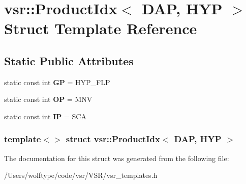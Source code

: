 \hypertarget{structvsr_1_1_product_idx_3_01_d_a_p_00_01_h_y_p_01_4}{\section{vsr\-:\-:Product\-Idx$<$ D\-A\-P, H\-Y\-P $>$ Struct Template Reference}
\label{structvsr_1_1_product_idx_3_01_d_a_p_00_01_h_y_p_01_4}
}
\subsection*{Static Public Attributes}
\begin{DoxyCompactItemize}
\item 
\hypertarget{structvsr_1_1_product_idx_3_01_d_a_p_00_01_h_y_p_01_4_ab4cbc09dac0f9629e16b19daf29ee324}{static const int {\bfseries G\-P} = H\-Y\-P\-\_\-\-F\-L\-P}\label{structvsr_1_1_product_idx_3_01_d_a_p_00_01_h_y_p_01_4_ab4cbc09dac0f9629e16b19daf29ee324}

\item 
\hypertarget{structvsr_1_1_product_idx_3_01_d_a_p_00_01_h_y_p_01_4_a7d7dc37e8a861ee481f5c43a0e0eceed}{static const int {\bfseries O\-P} = M\-N\-V}\label{structvsr_1_1_product_idx_3_01_d_a_p_00_01_h_y_p_01_4_a7d7dc37e8a861ee481f5c43a0e0eceed}

\item 
\hypertarget{structvsr_1_1_product_idx_3_01_d_a_p_00_01_h_y_p_01_4_a766ee9d019dbfc17672aa1a1f3018914}{static const int {\bfseries I\-P} = S\-C\-A}\label{structvsr_1_1_product_idx_3_01_d_a_p_00_01_h_y_p_01_4_a766ee9d019dbfc17672aa1a1f3018914}

\end{DoxyCompactItemize}
\subsubsection*{template$<$$>$ struct vsr\-::\-Product\-Idx$<$ D\-A\-P, H\-Y\-P $>$}



The documentation for this struct was generated from the following file\-:\begin{DoxyCompactItemize}
\item 
/\-Users/wolftype/code/vsr/\-V\-S\-R/vsr\-\_\-templates.\-h\end{DoxyCompactItemize}
